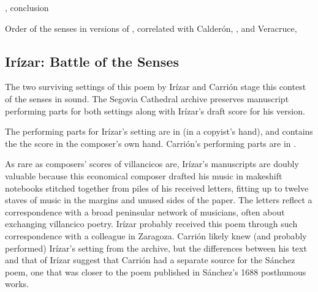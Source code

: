 \begin{poemexample}
    \caption{, conclusion}
    \label{poem:Si_los_sentidos-Sanchez-2}
\end{poemexample}

\begin{table}
    \caption{Order of the senses in versions of ,
    correlated with Calderón, , and
    Veracruce, } 
    \label{tab:senses-order}
\end{table}

\subsection{Irízar: Battle of the Senses}

The two surviving settings of this poem by Irízar and Carrión stage this
contest of the senses in sound.
The Segovia Cathedral archive preserves manuscript performing parts for both
settings along with Irízar's draft score for his version.%
\begin{Footnote}
    The performing parts for Irízar's setting are in  (in a
    copyist's hand), and  contains the the score in the
    composer's own hand.
    Carrión's performing parts are in .
\end{Footnote}
As rare as composers' scores of villancicos are, Irízar's manuscripts are doubly
valuable because this economical composer drafted his music in makeshift
notebooks stitched together from piles of his received letters, fitting up to
twelve staves of music in the margins and unused sides of the paper.%
    \Autocites
    {LopezCalo:IrizarLetters1}
    {Olarte:Irizar}
The letters reflect a correspondence with a broad peninsular network of
musicians, often about exchanging villancico poetry.%
    \Autocite{Rodriguez:Networks}
Irízar probably received this poem through such correspondence with a colleague
in Zaragoza.
Carrión likely knew (and probably performed) Irízar's setting from the archive,
but the differences between his text and that of Irízar suggest that Carrión had
a separate source for the Sánchez poem, one that was closer to the poem
published in Sánchez's 1688 posthumous works.%
    \Autocite[171--172]{Sanchez:LiraPoetica}


